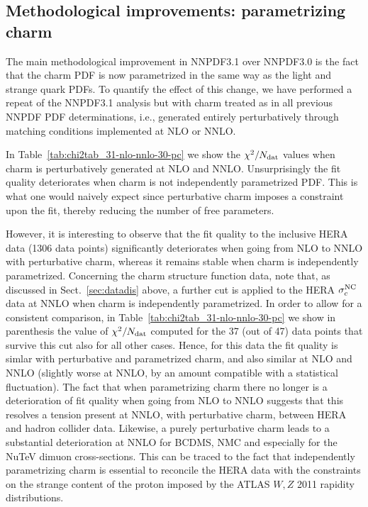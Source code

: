 \clearpage

\clearpage

\subsection{Methodological improvements: parametrizing charm}
\label{sec:results-mc}

The main methodological improvement in NNPDF3.1 over
NNPDF3.0 is the fact that the charm PDF is now parametrized  
in the same way as the light and strange quark PDFs.
To quantify the effect of this change, we have performed a repeat of the NNPDF3.1 analysis
but with charm treated as in all previous NNPDF PDF determinations, 
i.e., generated
entirely perturbatively through matching conditions implemented at NLO or NNLO. 


In Table~\ref{tab:chi2tab_31-nlo-nnlo-30-pc} we show the 
$\chi^2/N_{\rm dat}$ values when charm is  perturbatively
generated  at NLO and NNLO. Unsurprisingly the fit quality deteriorates when
charm is not independently parametrized PDF. 
This is what one would naively expect 
since perturbative charm imposes a constraint upon the fit, thereby reducing the number
of free parameters. 

 However, it is interesting to observe that 
the fit quality to the inclusive HERA data (1306 data points)
significantly deteriorates
 when going from NLO to NNLO with perturbative charm, whereas it
 remains stable when charm is independently parametrized. Concerning
 the charm structure function data, note that,
 as discussed in Sect.~\ref{sec:datadis} above, a further cut is applied to 
 the HERA $\sigma_c^{\rm NC}$ data at NNLO when charm is independently
 parametrized. In order to allow for a consistent comparison, in
 Table~\ref{tab:chi2tab_31-nlo-nnlo-30-pc} we 
 show in parenthesis the value of 
 $\chi^2/N_{\rm dat}$ computed for the 37 (out of 47) data points that survive
 this cut also for all other  cases. Hence, for this data the fit
 quality is simlar with perturbative and parametrized charm, and also
 similar at NLO and NNLO (slightly worse at NNLO, by an amount
 compatible with a statistical fluctuation).
The fact  that when  parametrizing charm 
 there no longer is a deterioration of fit quality when going
from NLO to NNLO suggests that this  
resolves a tension present at NNLO, with  perturbative charm, 
between HERA and hadron collider data. Likewise, a purely perturbative charm leads
to a substantial deterioration at NNLO for BCDMS, NMC and especially
for the NuTeV dimuon cross-sections. This can be traced to the fact that
independently parametrizing charm is essential to reconcile the HERA data with the
constraints on the strange content of the proton imposed by
the ATLAS $W,Z$ 2011 rapidity distributions. 

